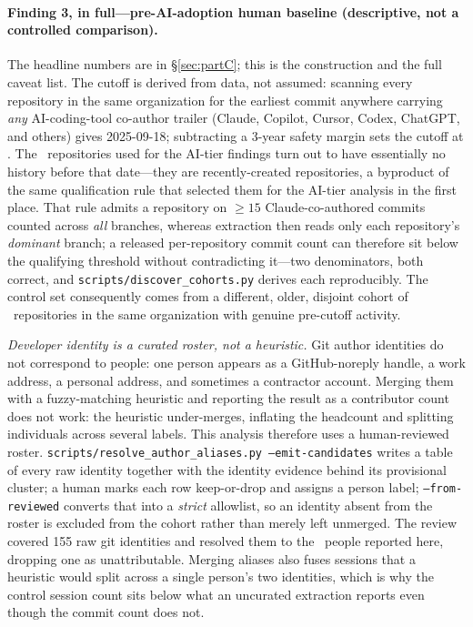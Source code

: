 \paragraph{Finding 3, in full---pre-AI-adoption human baseline (descriptive, not a controlled comparison).} The headline numbers are in \S\ref{sec:partC}; this is the construction and the full caveat list. The cutoff is derived from data, not assumed: scanning every repository in the same organization for the earliest commit anywhere carrying \emph{any} AI-coding-tool co-author trailer (Claude, Copilot, Cursor, Codex, ChatGPT, and others) gives 2025-09-18; subtracting a 3-year safety margin sets the cutoff at \statPCCtrlUntil. The \statPCRepos\ repositories used for the AI-tier findings turn out to have essentially no history before that date---they are recently-created repositories, a byproduct of the same qualification rule that selected them for the AI-tier analysis in the first place. That rule admits a repository on ${\ge}15$ Claude-co-authored commits counted across \emph{all} branches, whereas extraction then reads only each repository's \emph{dominant} branch; a released per-repository commit count can therefore sit below the qualifying threshold without contradicting it---two denominators, both correct, and \texttt{scripts/discover\_cohorts.py} derives each reproducibly. The control set consequently comes from a different, older, disjoint cohort of \statPCCtrlRepos\ repositories in the same organization with genuine pre-cutoff activity.

\emph{Developer identity is a curated roster, not a heuristic.} Git author identities do not correspond to people: one person appears as a GitHub-noreply handle, a work address, a personal address, and sometimes a contractor account. Merging them with a fuzzy-matching heuristic and reporting the result as a contributor count does not work: the heuristic under-merges, inflating the headcount and splitting individuals across several labels. This analysis therefore uses a human-reviewed roster. \texttt{scripts/resolve\_author\_aliases.py --emit-candidates} writes a table of every raw identity together with the identity evidence behind its provisional cluster; a human marks each row keep-or-drop and assigns a person label; \texttt{--from-reviewed} converts that into a \emph{strict} allowlist, so an identity absent from the roster is excluded from the cohort rather than merely left unmerged. The review covered 155 raw git identities and resolved them to the \statPCCtrlDevelopers\ people reported here, dropping one as unattributable. Merging aliases also fuses sessions that a heuristic would split across a single person's two identities, which is why the control session count sits below what an uncurated extraction reports even though the commit count does not.

